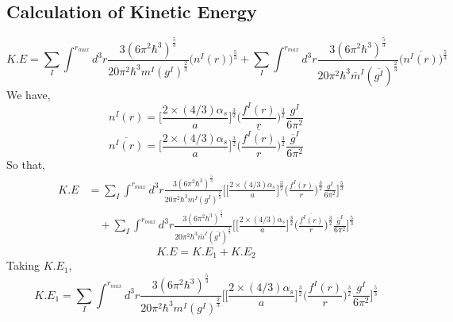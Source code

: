 \documentclass[fleqn, 10pt]{article}
\begin{document}
        \subsection{ Calculation of Kinetic Energy }
            \begin{equation}
            K.E = \sum_I \int^{r_{max}} d^3r \frac{3(6\pi^2\hbar^3)^\frac{5}{3}}{20\pi^2\hbar^3m^I(g^I)^\frac{2}{3}} \bigl(n^I(r)\bigr)^\frac{5}{3} + \sum_I \int^{r_{max}} d^3r \frac{3(6\pi^2\hbar^3)^\frac{5}{3}}{20\pi^2\hbar^3\overline{m}^I (\overline{g^I})^\frac{2}{3}} \bigl(\overline{n^I(r)}\bigr)^\frac{5}{3}
            \label{23}
            \end{equation}
            We have, 
            \begin{equation}
            n^I(r) = \biggl[\frac{2 \times (4/3)\alpha_s}{a}\biggr]^\frac{3}{2} \biggl(\frac{f^I(r)}{r}\biggr)^\frac{3}{2} \frac{g^I}{6\pi^2} 
            \label{24}
            \end{equation}
            \begin{equation}
            \overline{n^I(r)} = \biggl[\frac{2 \times (4/3)\alpha_s}{a}\biggr]^\frac{3}{2} \biggl(\frac{\overline{f^I(r)}}{r}\biggr)^\frac{3}{2} \frac{\overline{g}^I}{6\pi^2}
            \label{25}
            \end{equation}
            So that, 
            \begin{equation}
            \begin{split}
            K.E  &= \sum_I \int^{r_{max}} d^3r \frac{3(6\pi^2\hbar^3)^\frac{5}{3}}{20\pi^2\hbar^3m^I(g^I)^\frac{2}{3}} \biggl[\biggl[\frac{2 \times (4/3)\alpha_s}{a}\biggr]^\frac{3}{2} \biggl(\frac{f^I(r)}{r}\biggr)^\frac{3}{2} \frac{g^I}{6\pi^2} \biggr]^\frac{5}{3} \\ & \quad + \sum_I \int^{r_{max}} d^3r \frac{3(6\pi^2\hbar^3)^\frac{5}{3}}{20\pi^2\hbar^3\overline{m}^I (\overline{g^I})^\frac{2}{3}} \biggl[\biggl[\frac{2 \times (4/3)\alpha_s}{a}\biggr]^\frac{3}{2} \biggl(\frac{\overline{f^I(r)}}{r}\biggr)^\frac{3}{2} \frac{\overline{g}^I}{6\pi^2}\biggr]^\frac{5}{3}
            \label{26}
            \end{split}
            \end{equation}
            \begin{equation}
            K.E = K.E_1 + K.E_2 
            \end{equation}
            Taking $K.E_1$, 
            \begin{equation*}
            K.E_1 = \sum_I \int^{r_{max}} d^3r \frac{3(6\pi^2\hbar^3)^\frac{5}{3}}{20\pi^2\hbar^3m^I(g^I)^\frac{2}{3}} \biggl[\biggl[\frac{2 \times (4/3)\alpha_s}{a}\biggr]^\frac{3}{2} \biggl(\frac{f^I(r)}{r}\biggr)^\frac{3}{2} \frac{g^I}{6\pi^2} \biggr]^\frac{5}{3}
            \end{equation*}
\end{document}
